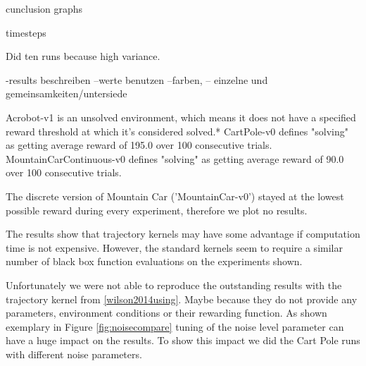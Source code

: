 cunclusion graphs

timesteps

Did ten runs because high variance.

-results beschreiben
--werte benutzen
--farben,
-- einzelne und gemeinsamkeiten/untersiede

Acrobot-v1 is an unsolved environment, which means it does not have a specified reward threshold at which it's considered solved.*
CartPole-v0 defines "solving" as getting average reward of 195.0 over 100 consecutive trials.
MountainCarContinuous-v0 defines "solving" as getting average reward of 90.0 over 100 consecutive trials.

The discrete version of Mountain Car ('MountainCar-v0') stayed at the lowest possible reward during every experiment, therefore we plot no results.

The results show that trajectory kernels may have some advantage if computation time is not expensive. However, the standard kernels seem to require a similar number of black box function evaluations on the experiments shown.

Unfortunately we were not able to reproduce the outstanding results with the trajectory kernel from \ref{wilson2014using}. Maybe because they do not provide any parameters, environment conditions or their rewarding function. As shown exemplary in Figure \ref{fig:noisecompare} tuning of the noise level parameter can have a huge impact on the results. To show this impact we did the Cart Pole runs with different noise parameters.

%
%
